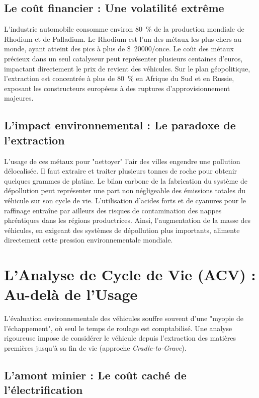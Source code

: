\documentclass[12pt, a4paper]{article}
\begin{document}
\subsection{Le coût financier : Une volatilité extrême}

L'industrie automobile consomme environ \SI{80}{\percent} de la production mondiale de Rhodium et de Palladium. Le Rhodium est l'un des métaux les plus chers au monde, ayant atteint des pics à plus de \SI{20000}[\$]{}/once. Le coût des métaux précieux dans un seul catalyseur peut représenter plusieurs centaines d'euros, impactant directement le prix de revient des véhicules. Sur le plan géopolitique, l'extraction est concentrée à plus de \SI{80}{\percent} en Afrique du Sud et en Russie, exposant les constructeurs européens à des ruptures d'approvisionnement majeures.

\subsection{L'impact environnemental : Le paradoxe de l'extraction}

L'usage de ces métaux pour "nettoyer" l'air des villes engendre une pollution délocalisée. Il faut extraire et traiter plusieurs tonnes de roche pour obtenir quelques grammes de platine. Le bilan carbone de la fabrication du système de dépollution peut représenter une part non négligeable des émissions totales du véhicule sur son cycle de vie. L'utilisation d'acides forts et de cyanures pour le raffinage entraîne par ailleurs des risques de contamination des nappes phréatiques dans les régions productrices. Ainsi, l'augmentation de la masse des véhicules, en exigeant des systèmes de dépollution plus importants, alimente directement cette pression environnementale mondiale.

\section{L'Analyse de Cycle de Vie (ACV) : Au-delà de l'Usage}

L'évaluation environnementale des véhicules souffre souvent d'une "myopie de l'échappement", où seul le temps de roulage est comptabilisé. Une analyse rigoureuse impose de considérer le véhicule depuis l'extraction des matières premières jusqu'à sa fin de vie (approche \textit{Cradle-to-Grave}).

\subsection{L'amont minier : Le coût caché de l'électrification}
\end{document}
